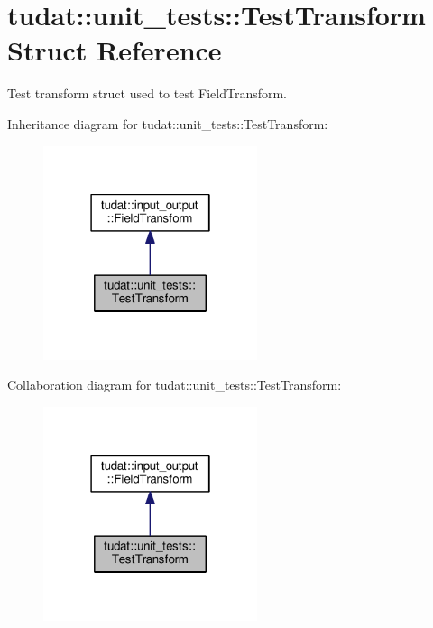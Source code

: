 \hypertarget{structtudat_1_1unit__tests_1_1TestTransform}{}\section{tudat\+:\+:unit\+\_\+tests\+:\+:Test\+Transform Struct Reference}
\label{structtudat_1_1unit__tests_1_1TestTransform}


Test transform struct used to test Field\+Transform.  




Inheritance diagram for tudat\+:\+:unit\+\_\+tests\+:\+:Test\+Transform\+:
\nopagebreak
\begin{figure}[H]
\begin{center}
\leavevmode
\includegraphics[width=178pt]{structtudat_1_1unit__tests_1_1TestTransform__inherit__graph}
\end{center}
\end{figure}


Collaboration diagram for tudat\+:\+:unit\+\_\+tests\+:\+:Test\+Transform\+:
\nopagebreak
\begin{figure}[H]
\begin{center}
\leavevmode
\includegraphics[width=178pt]{structtudat_1_1unit__tests_1_1TestTransform__coll__graph}
\end{center}
\end{figure}
